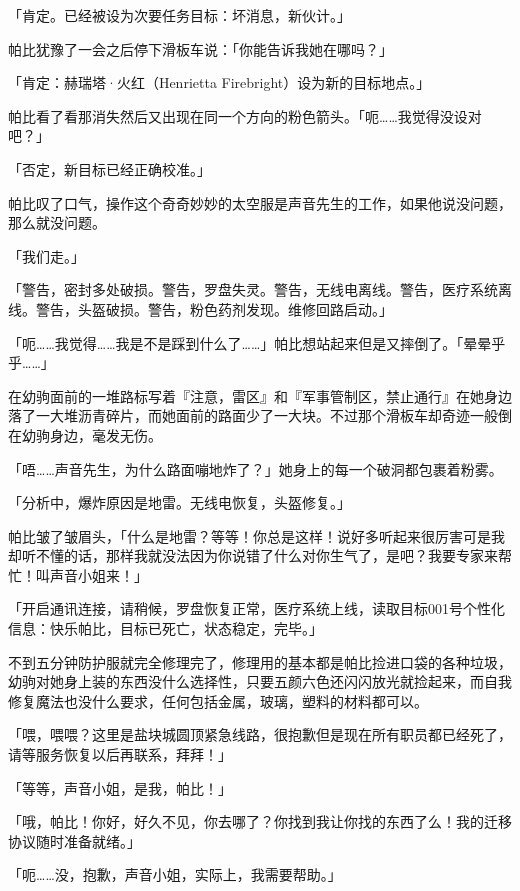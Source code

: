 「{\mt 肯定。已经被设为次要任务目标：坏消息，新伙计。}」

帕比犹豫了一会之后停下滑板车说：「你能告诉我她在哪吗？」

「{\mt 肯定：赫瑞塔·火红（Henrietta Firebright）设为新的目标地点。}」

帕比看了看那消失然后又出现在同一个方向的粉色箭头。「呃……我觉得没设对吧？」

「{\mt 否定，新目标已经正确校准。}」

帕比叹了口气，操作这个奇奇妙妙的太空服是声音先生的工作，如果他说没问题，那么就没问题。

「我们走。」

\horizonline


「{\mt 警告，密封多处破损。警告，罗盘失灵。警告，无线电离线。警告，医疗系统离线。警告，头盔破损。警告，粉色药剂发现。维修回路启动。}」

「呃……我觉得……我是不是踩到什么了……」帕比想站起来但是又摔倒了。「晕晕乎乎……」

在幼驹面前的一堆路标写着『注意，雷区』和『军事管制区，禁止通行』在她身边落了一大堆沥青碎片，而她面前的路面少了一大块。不过那个滑板车却奇迹一般倒在幼驹身边，毫发无伤。

「唔……声音先生，为什么路面嘣地炸了？」她身上的每一个破洞都包裹着粉雾。

「{\mt 分析中，爆炸原因是地雷。无线电恢复，头盔修复。}」

帕比皱了皱眉头，「什么是地雷？等等！你总是这样！说好多听起来很厉害可是我却听不懂的话，那样我就没法因为你说错了什么对你生气了，是吧？我要专家来帮忙！叫声音小姐来！」

「{\mt 开启通讯连接，请稍候，罗盘恢复正常，医疗系统上线，读取目标001号个性化信息：快乐帕比，目标已死亡，状态稳定，完毕。}」

不到五分钟防护服就完全修理完了，修理用的基本都是帕比捡进口袋的各种垃圾，幼驹对她身上装的东西没什么选择性，只要五颜六色还闪闪放光就捡起来，而自我修复魔法也没什么要求，任何包括金属，玻璃，塑料的材料都可以。

「喂，喂喂？这里是盐块城圆顶紧急线路，很抱歉但是现在所有职员都已经死了，请等服务恢复以后再联系，拜拜！」

「等等，声音小姐，是我，帕比！」

「哦，帕比！你好，好久不见，你去哪了？你找到我让你找的东西了么！我的迁移协议随时准备就绪。」

「呃……没，抱歉，声音小姐，实际上，我需要帮助。」

